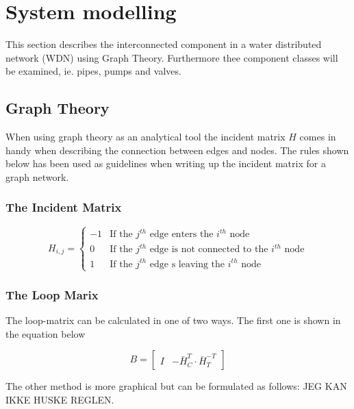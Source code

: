 \section{System modelling }
This section describes the interconnected component in a water distributed network (WDN) using Graph Theory. Furthermore thee component classes will be examined, ie. pipes, pumps and valves.


\subsection{Graph Theory}
When using graph theory as an analytical tool the incident matrix $H$ comes in handy when describing the connection between edges and nodes. The rules shown below has been used as guidelines when writing up the incident matrix for a graph network. 

\subsubsection{The Incident Matrix}
\begin{equation*}
	H_{i,j} = \begin{cases}
		-1 & \text{If the $j^{th}$ edge enters the $i^{th}$ node} \\
		0 & \text{If the $j^{th}$ edge is not connected to the $i^{th}$ node} \\
		1 & \text{If the $j^{th}$ edge s leaving the $i^{th}$ node}
	\end{cases}
\end{equation*} %

\subsubsection{The Loop Marix}
The loop-matrix can be calculated in one of two ways. The first one is shown in the equation below

\begin{equation}
	B = \begin{bmatrix}
		I & -\bar{H}_{C}^{T}\cdot\bar{H}_{T}^{-T}
	\end{bmatrix}
\end{equation}


The other method is more graphical but can be formulated as follows: JEG KAN IKKE HUSKE REGLEN.

\newpage
